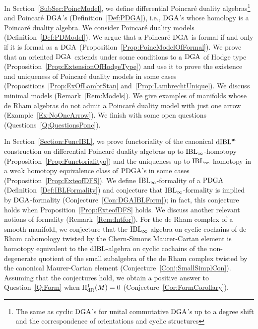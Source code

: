 \documentclass[\MainFolder/Text.tex]{subfiles}
\begin{document}
In Section~\ref{SubSec:PoincModel}, we define differential Poincar\'e duality algebras\footnote{The same as cyclic $\mathrm{DGA}$'s for unital commutative $\mathrm{DGA}$'s up to a degree shift and the correspondence of orientations and cyclic structures} and Poincar\'e $\mathrm{DGA}$'s (Definition~\ref{Def:PDGA}), i.e., $\mathrm{DGA}$'s whose homology is a Poincar\'e duality algebra.
We consider Poincar\'e duality models (Definition~\ref{Def:PDModel}).
We argue that a Poincar\'e $\mathrm{DGA}$ is formal if and only if it is formal as a $\mathrm{DGA}$ (Proposition~\ref{Prop:PoincModelOfFormal}).
We prove that an oriented $\mathrm{DGA}$ extends under some conditions to a $\mathrm{DGA}$ of Hodge type (Proposition~\ref{Prop:ExtensionOfHodgeType}) and use it to prove the existence and uniqueness of Poincar\'e duality models in some cases (Propositions~\ref{Prop:ExOfLambrStan} and~\ref{Prop:LambrechtUnique}).
We discuss minimal models (Remark~\ref{Rem:Models}).
We give examples of manifolds whose de Rham algebras do not admit a Poincar\'e duality model with just one arrow (Example~\ref{Ex:NoOneArrow}).
We finish with some open questions (Questions~\ref{Q:QuestionsPonc}).

In Section~\ref{Section:FuncIBL}, we prove functoriality of the canonical $\mathrm{dIBL}^{\mathfrak{m}}$ construction on differential Poincar\'e duality algebras up to $\mathrm{IBL}_\infty$-homotopy (Proposition~\ref{Prop:Functorialityo}) and the uniqueness up to $\mathrm{IBL}_\infty$-homotopy in a weak homotopy equivalence class of $\mathrm{PDGA}$'s in some cases (Proposition~\ref{Prop:ExteofDFS}).
We define $\mathrm{IBL}_\infty$-formality of a $\mathrm{PDGA}$ (Definition~\ref{Def:IBLFormality}) and conjecture that $\mathrm{IBL}_\infty$-formality is implied by $\mathrm{DGA}$-formality (Conjecture~\ref{Con:DGAIBLForm}); in fact, this conjecture holds when Proposition~\ref{Prop:ExteofDFS} holds.
We discuss another relevant notions of formality (Remark~\ref{Rem:Intfor}).
For the de Rham complex of a smooth manifold, we conjecture that the $\mathrm{IBL}_\infty$-algebra on cyclic cochains of de Rham cohomology twisted by the Chern-Simons Maurer-Cartan element is homotopy equivalent to the $\mathrm{dIBL}$-algebra on cyclic cochains of the non-degenerate quotient of the small subalgebra of the de Rham complex twisted by the canonical Maurer-Cartan element (Conjecture~\ref{Conj:SmallSimplCon}).
Assuming that the conjectures hold, we obtain a positive answer to Question~\ref{Q:Form} when $\mathrm{H}_{\mathrm{dR}}^1(M)=0$ (Conjecture~\ref{Cor:FormCorollary}).
\end{document}
